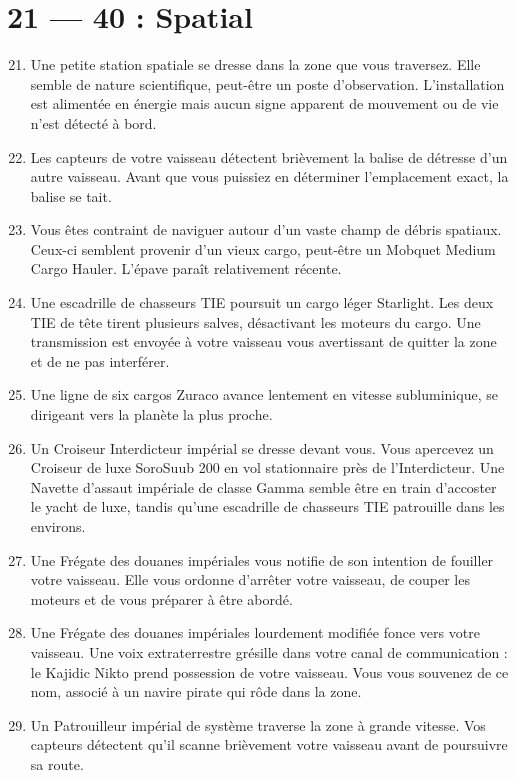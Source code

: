 \documentclass{article}
\begin{document}
\section*{21 --- 40 : Spatial}
\begin{enumerate}
	\setcounter{enumi}{20}
	\item Une petite station spatiale se dresse dans la zone que vous traversez. Elle semble de nature scientifique, peut-être un poste d’observation. L’installation est alimentée en énergie mais aucun signe apparent de mouvement ou de vie n’est détecté à bord.
	\item Les capteurs de votre vaisseau détectent brièvement la balise de détresse d’un autre vaisseau. Avant que vous puissiez en déterminer l’emplacement exact, la balise se tait.
	\item Vous êtes contraint de naviguer autour d’un vaste champ de débris spatiaux. Ceux-ci semblent provenir d’un vieux cargo, peut-être un Mobquet Medium Cargo Hauler. L’épave paraît relativement récente.
	\item Une escadrille de chasseurs TIE poursuit un cargo léger Starlight. Les deux TIE de tête tirent plusieurs salves, désactivant les moteurs du cargo. Une transmission est envoyée à votre vaisseau vous avertissant de quitter la zone et de ne pas interférer.
	\item Une ligne de six cargos Zuraco avance lentement en vitesse subluminique, se dirigeant vers la planète la plus proche.
	\item Un Croiseur Interdicteur impérial se dresse devant vous. Vous apercevez un Croiseur de luxe SoroSuub 200 en vol stationnaire près de l’Interdicteur. Une Navette d’assaut impériale de classe Gamma semble être en train d’accoster le yacht de luxe, tandis qu’une escadrille de chasseurs TIE patrouille dans les environs.
	\item Une Frégate des douanes impériales vous notifie de son intention de fouiller votre vaisseau. Elle vous ordonne d’arrêter votre vaisseau, de couper les moteurs et de vous préparer à être abordé.
	\item Une Frégate des douanes impériales lourdement modifiée fonce vers votre vaisseau. Une voix extraterrestre grésille dans votre canal de communication : le Kajidic Nikto prend possession de votre vaisseau. Vous vous souvenez de ce nom, associé à un navire pirate qui rôde dans la zone.
	\item Un Patrouilleur impérial de système traverse la zone à grande vitesse. Vos capteurs détectent qu’il scanne brièvement votre vaisseau avant de poursuivre sa route.

\end{enumerate}
\end{document}
